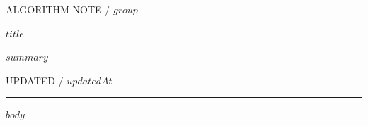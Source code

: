 \documentclass[11pt,UTF8,fontset=fandol]{ctexart}
\begin{document}
\thispagestyle{empty}

\begin{center}
  \vspace*{12mm}
  {\small\ttfamily\color{Accent} ALGORITHM NOTE / $group$\par}
  \vspace{16mm}
  {\fontsize{36}{43}\selectfont\sffamily\bfseries\color{Ink} $title$\par}
  \vspace{8mm}
  {\large\color{Muted}\parbox{0.78\linewidth}{\centering $summary$}\par}
  \vspace{9mm}
  {\small\ttfamily\color{Muted} UPDATED / $updatedAt$\par}
  \vspace{13mm}
  {\color{Accent}\rule{22mm}{1.3pt}\par}
\end{center}

\vspace{12mm}

$body$
\end{document}
